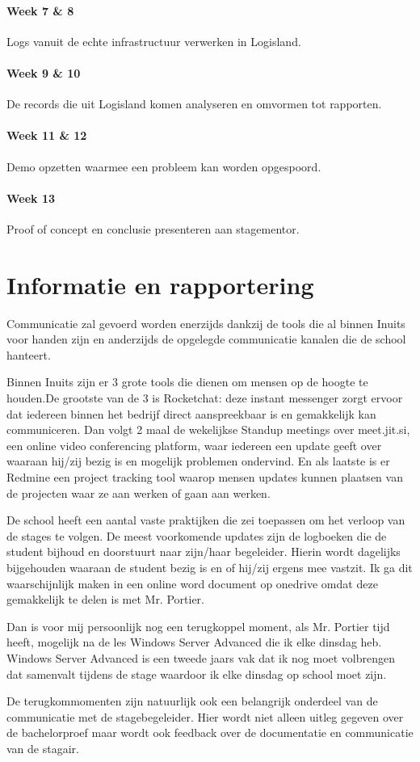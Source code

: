 \documentclass[a4paper]{article}
\begin{document}
\paragraph{Week 7 \& 8} Logs vanuit de echte infrastructuur verwerken in Logisland.
\paragraph{Week 9 \& 10} De records die uit Logisland komen analyseren en omvormen tot rapporten.
\paragraph{Week 11 \& 12} Demo opzetten waarmee een probleem kan worden opgespoord.
\paragraph{Week 13} Proof of concept en conclusie presenteren aan stagementor.

\newpage{}
\section{Informatie en rapportering}
Communicatie zal gevoerd worden enerzijds dankzij de tools die al binnen Inuits voor handen zijn en anderzijds de opgelegde communicatie kanalen die de school hanteert.
\par
Binnen Inuits zijn er 3 grote tools die dienen om mensen op de hoogte te houden.De grootste van de 3 is Rocketchat: deze instant messenger zorgt ervoor dat iedereen binnen het bedrijf direct aanspreekbaar is en gemakkelijk kan communiceren.
Dan volgt 2 maal de wekelijkse Standup meetings over meet.jit.si, een online video conferencing platform, waar iedereen een update geeft over waaraan hij/zij bezig is en mogelijk problemen ondervind.
En als laatste is er Redmine een project tracking tool waarop mensen updates kunnen plaatsen van de projecten waar ze aan werken of gaan aan werken.
\par
De school heeft een aantal vaste praktijken die zei toepassen om het verloop van de stages te volgen.
De meest voorkomende updates zijn de logboeken die de student bijhoud en doorstuurt naar zijn/haar begeleider.
Hierin wordt dagelijks bijgehouden waaraan de student bezig is en of hij/zij ergens mee vastzit. Ik ga dit waarschijnlijk maken in een online word document op onedrive omdat deze gemakkelijk te delen is met Mr. Portier.
\par
Dan is voor mij persoonlijk nog een terugkoppel moment, als Mr. Portier tijd heeft, mogelijk na de les Windows Server Advanced die ik elke dinsdag heb. 
Windows Server Advanced is een tweede jaars vak dat ik nog moet volbrengen dat samenvalt tijdens de stage waardoor ik elke dinsdag op school moet zijn.
\par
De terugkommomenten zijn natuurlijk ook een belangrijk onderdeel van de communicatie met de stagebegeleider. Hier wordt niet alleen uitleg gegeven over de bachelorproef maar wordt ook feedback over de documentatie en communicatie van de stagair.
\end{document}
